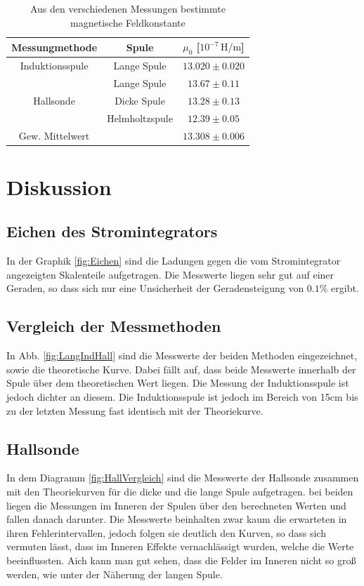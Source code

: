 \documentclass[12pt,a4paper,titlepage,headinclude,bibtotoc]{scrartcl}
\begin{document}
\begin{table}[!htb]
	\centering
	\begin{tabular}{|c|c|c|}
	\hline
	Messungmethode & Spule & $\mu_0$ [$10^{-7}\,\si{\henry\per\meter}$]\\
	\hline
	\hline
	Induktionsspule & Lange Spule & $13.020 \pm 0.020$\\
	\hline
	          & Lange Spule & $13.67 \pm 0.11$ \\
	Hallsonde & Dicke Spule & $13.28 \pm 0.13$ \\
	          & Helmholtzspule & $12.39 \pm 0.05$ \\
	\hline\hline
	Gew. Mittelwert	& & $13.308\pm 0.006$ \\\hline
	\end{tabular}
	\caption{Aus den verschiedenen Messungen bestimmte magnetische Feldkonstante}
	\label{tab:mu}
\end{table}


\section{Diskussion}
\label{sec:diskussion}
\subsection{Eichen des Stromintegrators}
In der Graphik \ref{fig:Eichen} sind die Ladungen gegen die vom Stromintegrator angezeigten Skalenteile aufgetragen.
Die Messwerte liegen sehr gut auf einer Geraden, so dass sich nur eine Unsicherheit der Geradensteigung von $0.1\%$ ergibt.

\subsection{Vergleich der Messmethoden}
In Abb. \ref{fig:LangIndHall} sind die Messwerte der beiden Methoden eingezeichnet, sowie die theoretische Kurve.
Dabei fällt auf, dass beide Messwerte innerhalb der Spule über dem theoretischen Wert liegen.
Die Messung der Induktionsspule ist jedoch dichter an diesem.
Die Induktionsspule ist jedoch im Bereich von 15cm bis zu der letzten Messung fast identisch mit der Theoriekurve.

\subsection{Hallsonde}
In dem Diagramm \ref{fig:HallVergleich} sind die Messwerte der Hallsonde zusammen mit den Theoriekurven für die dicke und die lange Spule aufgetragen.
bei beiden liegen die Messungen im Inneren der Spulen über den berechneten Werten und fallen danach darunter.
Die Messwerte beinhalten zwar kaum die erwarteten in ihren Fehlerintervallen, jedoch folgen sie deutlich den Kurven, so dass sich vermuten lässt, dass im Inneren Effekte vernachlässigt wurden, welche die Werte beeinflussten.
Aich kann man gut sehen, dass die Felder im Inneren nicht so groß werden, wie unter der Näherung der langen Spule.
\end{document}

